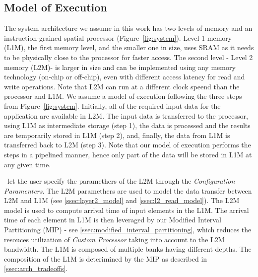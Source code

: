 \vspace{-1mm}
\subsection{Model of Execution}
\label{ssec:system_under_analysis}
\vspace{-1mm}
The system architecture we assume in this work has two levels of memory and an instruction-grained spatial processor (Figure~\ref{fig:system}). Level 1 memory (L1M)\footnotemark, the first memory level, and the smaller one in size, uses SRAM as it needs to be physically close to the processor for faster access. The second level - Level 2 memory (L2M)\footnotemark[\value{footnote}] - is larger in size and can be implemented using any memory technology (on-chip or off-chip), even with different access latency for read and write operations. Note that L2M can run at a different clock speend than the processor and L1M.
We assume a model of execution following the three steps from Figure~\ref{fig:system}. Initially, all of the required input data for the application are available in L2M. The input data is transferred to the processor, using L1M as intermediate storage (step 1), the data is processed and the results are temporarily stored in L1M (step 2), and, finally, the data from L1M is transferred back to L2M (step 3). Note that our model of execution performs the steps in a pipelined manner, hence only part of the data will be stored in L1M at any given time.

\frameworkname~let the user specify the paramethers of the L2M through the \textit{Configuration Paramenters}. The L2M paramethers are used to model the data transfer between L2M and L1M (see \ref{ssec:layer2_model} and \ref{ssec:l2_read_model}). The L2M model is used to compute arrival time of input elements in the L1M. The arrival time of each element in L1M is then leveraged by our Modified Interval Partitioning (MIP) - see \ref{ssec:modified_interval_partitioning}, which reduces the resouces utilization of \textit{Custom Processor} taking into account to the L2M bandwidth.
The L1M is composed of multiple banks having different depths. The composition of the L1M is deterimined by the MIP as described in \ref{ssec:arch_tradeoffs}.


